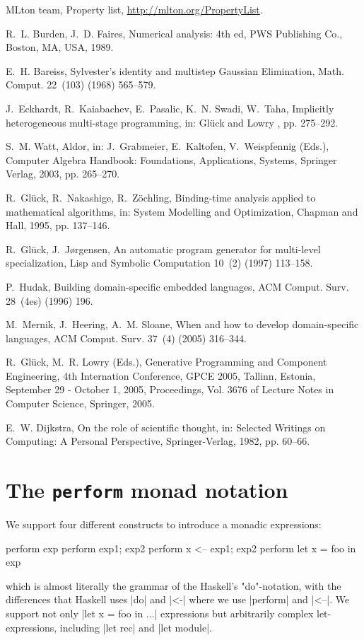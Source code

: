 \documentclass{elsart}
\begin{document}
\begin{thebibliography}{10}
{{MLton} team}, Property list, \url{http://mlton.org/PropertyList}.

R.~L. Burden, J.~D. Faires, Numerical analysis: 4th ed, PWS Publishing Co.,
  Boston, MA, USA, 1989.

E.~H. Bareiss, {S}ylvester's identity and multistep {G}aussian {Elimination},
  Math. Comput. 22~(103) (1968) 565--579.

J.~Eckhardt, R.~Kaiabachev, E.~Pasalic, K.~N. Swadi, W.~Taha, Implicitly
  heterogeneous multi-stage programming, in: Gl{\"u}ck and Lowry
  \cite{DBLP:conf/gpce/2005}, pp. 275--292.

S.~M. Watt, Aldor, in: J.~Grabmeier, E.~Kaltofen, V.~Weispfennig (Eds.),
  Computer Algebra Handbook: Foundations, Applications, Systems, Springer
  Verlag, 2003, pp. 265--270.

R.~Gl{\"u}ck, R.~Nakashige, R.~Z{\"o}chling, Binding-time analysis applied to
  mathematical algorithms, in: System Modelling and Optimization, Chapman and
  Hall, 1995, pp. 137--146.

R.~Gl{\"u}ck, J.~J{\o}rgensen, An automatic program generator for multi-level
  specialization, Lisp and Symbolic Computation 10~(2) (1997) 113--158.

P.~Hudak, Building domain-specific embedded languages, ACM Comput. Surv.
  28~(4es) (1996) 196.

M.~Mernik, J.~Heering, A.~M. Sloane, When and how to develop domain-specific
  languages, ACM Comput. Surv. 37~(4) (2005) 316--344.

R.~Gl{\"u}ck, M.~R. Lowry (Eds.), Generative Programming and Component
  Engineering, 4th Internation Conference, GPCE 2005, Tallinn, Estonia,
  September 29 - October 1, 2005, Proceedings, Vol. 3676 of Lecture Notes in
  Computer Science, Springer, 2005.

E.~W. Dijkstra, On the role of scientific thought, in: Selected Writings on
  Computing: A Personal Perspective, Springer-Verlag, 1982, pp. 60--66.

\end{thebibliography}

\appendix
\section{The \texttt{perform} monad notation}
\label{app:perform}
We support four different constructs to introduce a monadic
expressions:
\begin{code}
  perform exp
  perform exp1; exp2
  perform x <-- exp1; exp2
  perform let x = foo in exp
\end{code}
which is almost literally the grammar of the Haskell's "do"-notation,
with the differences that Haskell uses |do| and |<-| where we use
|perform| and |<--|.
We support not only |let x = foo in ...|  expressions but arbitrarily
complex let-expressions, including |let rec| and |let module|.
\end{document}
